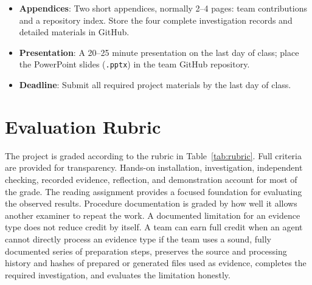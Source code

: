 \documentclass[12pt,letterpaper]{article}
\begin{document}
\begin{itemize}
    \item \textbf{Appendices}: Two short appendices, normally 2--4 pages: team contributions and a repository index. Store the four complete investigation records and detailed materials in GitHub.
    \item \textbf{Presentation}: A 20--25 minute presentation on the last day of class; place the PowerPoint slides (\texttt{.pptx}) in the team GitHub repository.
    \item \textbf{Deadline}: Submit all required project materials by the last day of class.
\end{itemize}

\section{Evaluation Rubric}
The project is graded according to the rubric in Table~\ref{tab:rubric}. Full criteria are provided for transparency.
Hands-on installation, investigation, independent checking, recorded evidence, reflection, and demonstration account for most of the grade. The reading assignment provides a focused foundation for evaluating the observed results. Procedure documentation is graded by how well it allows another examiner to repeat the work.
A documented limitation for an evidence type does not reduce credit by itself. A team can earn full credit when an agent cannot directly process an evidence type if the team uses a sound, fully documented series of preparation steps, preserves the source and processing history and hashes of prepared or generated files used as evidence, completes the required investigation, and evaluates the limitation honestly.
\end{document}
